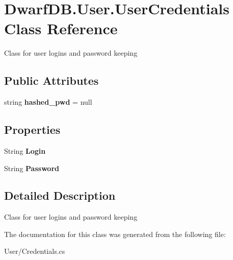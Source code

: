 \hypertarget{class_dwarf_d_b_1_1_user_1_1_user_credentials}{\section{Dwarf\+D\+B.\+User.\+User\+Credentials Class Reference}
\label{class_dwarf_d_b_1_1_user_1_1_user_credentials}
}


Class for user logins and password keeping  


\subsection*{Public Attributes}
\begin{DoxyCompactItemize}
\item 
\hypertarget{class_dwarf_d_b_1_1_user_1_1_user_credentials_a709a6c58fefe81c94e4e57a045605747}{string {\bfseries hashed\+\_\+pwd} = null}\label{class_dwarf_d_b_1_1_user_1_1_user_credentials_a709a6c58fefe81c94e4e57a045605747}

\end{DoxyCompactItemize}
\subsection*{Properties}
\begin{DoxyCompactItemize}
\item 
\hypertarget{class_dwarf_d_b_1_1_user_1_1_user_credentials_a425f41d9c436edd834855475d5a7a554}{String {\bfseries Login}}\label{class_dwarf_d_b_1_1_user_1_1_user_credentials_a425f41d9c436edd834855475d5a7a554}

\item 
\hypertarget{class_dwarf_d_b_1_1_user_1_1_user_credentials_ad74f3703718cd5f901e4b7fa0a704244}{String {\bfseries Password}}\label{class_dwarf_d_b_1_1_user_1_1_user_credentials_ad74f3703718cd5f901e4b7fa0a704244}

\end{DoxyCompactItemize}


\subsection{Detailed Description}
Class for user logins and password keeping 



The documentation for this class was generated from the following file\+:\begin{DoxyCompactItemize}
\item 
User/Credentials.\+cs\end{DoxyCompactItemize}
